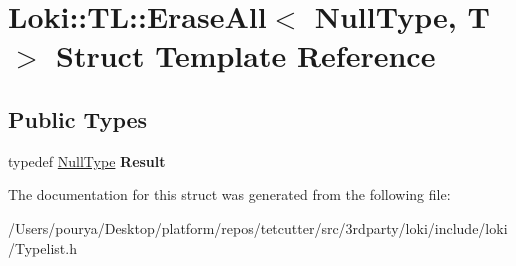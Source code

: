 \hypertarget{structLoki_1_1TL_1_1EraseAll_3_01NullType_00_01T_01_4}{}\section{Loki\+:\+:T\+L\+:\+:Erase\+All$<$ Null\+Type, T $>$ Struct Template Reference}
\label{structLoki_1_1TL_1_1EraseAll_3_01NullType_00_01T_01_4}
\subsection*{Public Types}
\begin{DoxyCompactItemize}
\item 
\hypertarget{structLoki_1_1TL_1_1EraseAll_3_01NullType_00_01T_01_4_a11effb9e1c726b3e31d01b25f8951190}{}typedef \hyperlink{classLoki_1_1NullType}{Null\+Type} {\bfseries Result}\label{structLoki_1_1TL_1_1EraseAll_3_01NullType_00_01T_01_4_a11effb9e1c726b3e31d01b25f8951190}

\end{DoxyCompactItemize}


The documentation for this struct was generated from the following file\+:\begin{DoxyCompactItemize}
\item 
/\+Users/pourya/\+Desktop/platform/repos/tetcutter/src/3rdparty/loki/include/loki/Typelist.\+h\end{DoxyCompactItemize}
